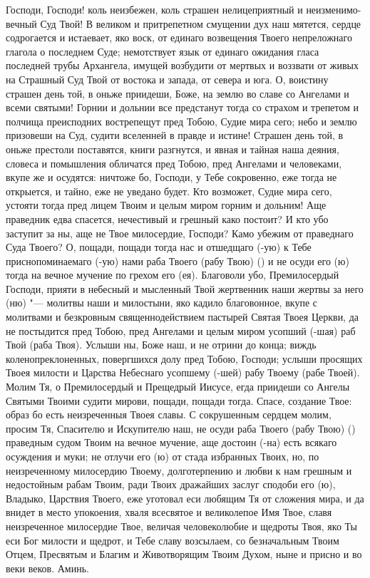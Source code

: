 \begin{mymulticols}
 

Господи, Господи! коль неизбежен, коль страшен нелицеприятный и неизменимо-вечный Суд Твой! В великом и притрепетном смущении дух наш мятется, сердце содрогается и истаевает, яко воск, от единаго возвещения Твоего непреложнаго глагола о последнем Суде; немотствует язык от единаго ожидания гласа последней трубы Архангела, имущей возбудити от мертвых и воззвати от живых на Страшный Суд Твой от востока и запада, от севера и юга. О, воистину страшен день той, в оньже приидеши, Боже, на землю во славе со Ангелами и всеми святыми! Горнии и дольнии все предстанут тогда со страхом и трепетом и полчища преисподних вострепещут пред Тобою, Судие мира сего; небо и землю призовеши на Суд, судити вселенней в правде и истине! Страшен день той, в оньже престоли поставятся, книги разгнутся, и явная и тайная наша деяния, словеса и помышления обличатся пред Тобою, пред Ангелами и человеками, вкупе же и осудятся: ничтоже бо, Господи, у Тебе сокровенно, еже тогда не открыется, и тайно, еже не уведано будет. Кто возможет, Судие мира сего, устояти тогда пред лицем Твоим и целым миром горним и дольним! Аще праведник едва спасется, нечестивый и грешный како постоит? И кто убо заступит за ны, аще не Твое милосердие, Господи? Камо убежим от праведнаго Суда Твоего? О, пощади, пощади тогда нас и отшедщаго (-ую) к Тебе приснопоминаемаго (-ую) нами раба Твоего (рабу Твою) () и не осуди его (ю) тогда на вечное мучение по грехом его (ея). Благоволи убо, Премилосердый Господи, прияти в небесный и мысленный Твой жертвенник наши жертвы за него (ню) "--- молитвы наши и милостыни, яко кадило благовонное, вкупе с молитвами и безкровным священнодействием пастырей Святая Твоея Церкви, да не постыдится пред Тобою, пред Ангелами и целым миром усопший (-шая) раб Твой (раба Твоя). Услыши ны, Боже наш, и не отрини до конца; виждь коленопреклоненных, повергшихся долу пред Тобою, Господи; услыши просящих Твоея милости и Царства Небеснаго усопшему (-шей) рабу Твоему (рабе Твоей). Молим Тя, о Премилосердый и Прещедрый Иисусе, егда приидеши со Ангелы Святыми Твоими судити мирови, пощади, пощади тогда. Спасе, создание Твое: образ бо есть неизреченныя Твоея славы. С сокрушенным сердцем молим, просим Тя, Спасителю и Искупителю наш, не осуди раба Твоего (рабу Твою) () праведным судом Твоим на вечное мучение, аще достоин (-на) есть всякаго осуждения и муки; не отлучи его (ю) от стада избранных Твоих, но, по неизреченному милосердию Твоему, долготерпению и любви к нам грешным и недостойным рабам Твоим, ради Твоих дражайших заслуг сподоби его (ю), Владыко, Царствия Твоего, еже уготовал еси любящим Тя от сложения мира, и да внидет в место упокоения, хваля всесвятое и великолепое Имя Твое, славя неизреченное милосердие Твое, величая человеколюбие и щедроты Твоя, яко Ты еси Бог милости и щедрот, и Тебе славу возсылаем, со безначальным Твоим Отцем, Пресвятым и Благим и Животворящим Твоим Духом, ныне и присно и во веки веков. Аминь. 

\end{mymulticols}

